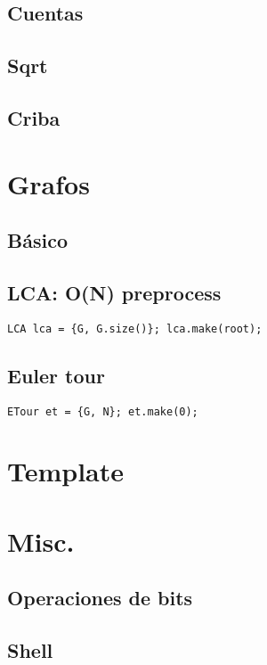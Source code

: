     \subsection{Cuentas}

    \subsection{Sqrt}

    \subsection{Criba}

        
\section{Grafos}
    \subsection{Básico}

    \subsection{LCA: O(N) preprocess}
        \texttt{LCA lca = \{G, G.size()\}; lca.make(root);}
        
    \subsection{Euler tour}
        \texttt{ETour et = \{G, N\}; et.make(0);}


\section{Template}


\section{Misc.}
    \subsection{Operaciones de bits}
    \subsection{Shell}
        



